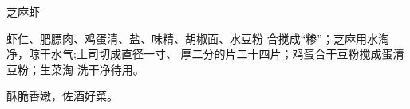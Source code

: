\begin{recipe}{芝麻虾}

\ingredients



\cooking

\step 虾仁、肥膘肉、鸡蛋清、盐、味精、胡椒面、水豆粉 合搅成“糁”；芝麻用水淘净，晾干水气;土司切成直径一寸、 厚二分的片二十四片；鸡蛋合干豆粉搅成蛋清豆粉；生菜淘 洗干净待用。

\notes

酥脆香嫩，佐酒好菜。

\end{recipe}

